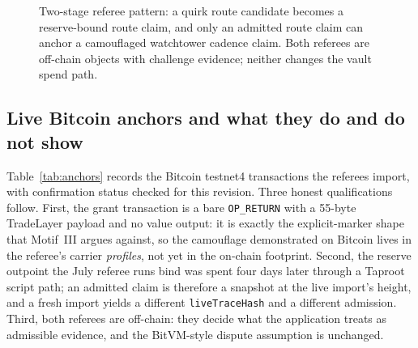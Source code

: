 \documentclass[11pt]{article}
\begin{document}
\begin{figure}[t]
\centering
{}
\caption{Two-stage referee pattern: a quirk route candidate becomes a
reserve-bound route claim, and only an admitted route claim can anchor a
camouflaged watchtower cadence claim. Both referees are off-chain objects with
challenge evidence; neither changes the vault spend path.}
\label{fig:referees}
\end{figure}

\subsection{Live Bitcoin anchors and what they do and do not show}

Table~\ref{tab:anchors} records the Bitcoin testnet4 transactions the referees
import, with confirmation status checked for this revision. Three honest
qualifications follow. First, the grant transaction is a bare
\texttt{OP\_RETURN} with a 55-byte TradeLayer payload and no value output: it
is exactly the explicit-marker shape that Motif~III argues against, so the
camouflage demonstrated on Bitcoin lives in the referee's carrier
\emph{profiles}, not yet in the on-chain footprint. Second, the reserve
outpoint the July referee runs bind was spent four days later through a
Taproot script path; an admitted claim is therefore a snapshot at the live
import's height, and a fresh import yields a different \texttt{liveTraceHash}
and a different admission. Third, both referees are off-chain: they decide what
the application treats as admissible evidence, and the BitVM-style dispute
assumption is unchanged.
\end{document}
